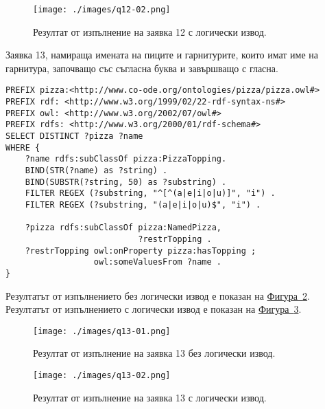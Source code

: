 \documentclass[12pt]{article}
\begin{document}
        \begin{center}
            \begin{figure}
            \centering
                \texttt{[image: ./images/q12-02.png]}
                \caption{Резултат от изпълнение на заявка 12 с логически извод.}
                \label{fig:q12-02}
            \end{figure}
        \end{center}

\clearpage
\pagebreak

        Заявка 13, намираща имената на пиците и гарнитурите, които имат име на гарнитура, започващо със съгласна буква и завършващо с гласна.
        
        \begin{lstlisting}[language=SPARQL,style=sparql]
PREFIX pizza:<http://www.co-ode.org/ontologies/pizza/pizza.owl#>
PREFIX rdf: <http://www.w3.org/1999/02/22-rdf-syntax-ns#>
PREFIX owl: <http://www.w3.org/2002/07/owl#>
PREFIX rdfs: <http://www.w3.org/2000/01/rdf-schema#>
SELECT DISTINCT ?pizza ?name
WHERE {
    ?name rdfs:subClassOf pizza:PizzaTopping.
    BIND(STR(?name) as ?string) .
    BIND(SUBSTR(?string, 50) as ?substring) .
    FILTER REGEX (?substring, "^[^(a|e|i|o|u)]", "i") .
    FILTER REGEX (?substring, "(a|e|i|o|u)$", "i") .
    
    ?pizza rdfs:subClassOf pizza:NamedPizza,
                           ?restrTopping .
    ?restrTopping owl:onProperty pizza:hasTopping ;
                  owl:someValuesFrom ?name .
}\end{lstlisting}

        Резултатът от изпълнението без логически извод е показан на \hyperref[fig:q13-01]{Фигура~\ref*{fig:q13-01}}.
        Резултатът от изпълнението с логически извод е показан на \hyperref[fig:q13-02]{Фигура~\ref*{fig:q13-02}}.

        \begin{center}
            \begin{figure}
            \centering
                \texttt{[image: ./images/q13-01.png]}
                \caption{Резултат от изпълнение на заявка 13 без логически извод.}
                \label{fig:q13-01}
            \end{figure}
        \end{center}

        \begin{center}
            \begin{figure}
            \centering
                \texttt{[image: ./images/q13-02.png]}
                \caption{Резултат от изпълнение на заявка 13 с логически извод.}
                \label{fig:q13-02}
            \end{figure}
        \end{center}
\end{document}
